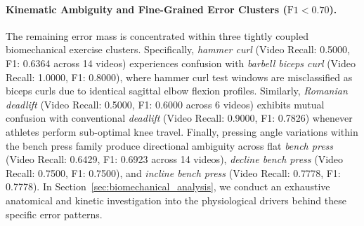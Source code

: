 \documentclass[preprint,12pt]{elsarticle}
\begin{document}
\paragraph{Kinematic Ambiguity and Fine-Grained Error Clusters ($\text{F1} < 0.70$).} The remaining error mass is concentrated within three tightly coupled biomechanical exercise clusters. Specifically, \textit{hammer curl} (Video Recall: 0.5000, F1: 0.6364 across 14 videos) experiences confusion with \textit{barbell biceps curl} (Video Recall: 1.0000, F1: 0.8000), where hammer curl test windows are misclassified as biceps curls due to identical sagittal elbow flexion profiles. Similarly, \textit{Romanian deadlift} (Video Recall: 0.5000, F1: 0.6000 across 6 videos) exhibits mutual confusion with conventional \textit{deadlift} (Video Recall: 0.9000, F1: 0.7826) whenever athletes perform sub-optimal knee travel. Finally, pressing angle variations within the bench press family produce directional ambiguity across flat \textit{bench press} (Video Recall: 0.6429, F1: 0.6923 across 14 videos), \textit{decline bench press} (Video Recall: 0.7500, F1: 0.7500), and \textit{incline bench press} (Video Recall: 0.7778, F1: 0.7778). In Section~\ref{sec:biomechanical_analysis}, we conduct an exhaustive anatomical and kinetic investigation into the physiological drivers behind these specific error patterns.
\end{document}
